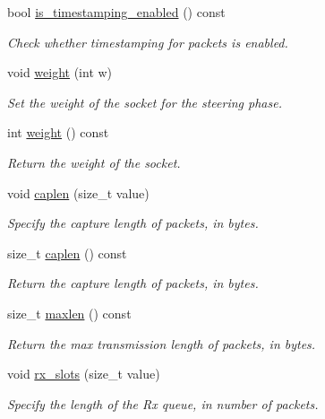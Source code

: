 \begin{DoxyCompactItemize}
bool \hyperlink{classpfq_1_1socket_a903d76a2685d7b64b9d0604686141fdc}{is\+\_\+timestamping\+\_\+enabled} () const 
\begin{DoxyCompactList}\small\item\em Check whether timestamping for packets is enabled. \end{DoxyCompactList}\item 
void \hyperlink{classpfq_1_1socket_ad843f3354b92083f01be9b5055f211b8}{weight} (int w)
\begin{DoxyCompactList}\small\item\em Set the weight of the socket for the steering phase. \end{DoxyCompactList}\item 
int \hyperlink{classpfq_1_1socket_a424e7a361a31569a8c6796d2c61b238d}{weight} () const 
\begin{DoxyCompactList}\small\item\em Return the weight of the socket. \end{DoxyCompactList}\item 
void \hyperlink{classpfq_1_1socket_ab68dbba5ef01041b9c96758c4a9f0a6c}{caplen} (size\+\_\+t value)
\begin{DoxyCompactList}\small\item\em Specify the capture length of packets, in bytes. \end{DoxyCompactList}\item 
size\+\_\+t \hyperlink{classpfq_1_1socket_a768bee4d974acdc5ee9ee879b0903c54}{caplen} () const 
\begin{DoxyCompactList}\small\item\em Return the capture length of packets, in bytes. \end{DoxyCompactList}\item 
size\+\_\+t \hyperlink{classpfq_1_1socket_a45bd7aa973fe4eccce899c552adfedb5}{maxlen} () const 
\begin{DoxyCompactList}\small\item\em Return the max transmission length of packets, in bytes. \end{DoxyCompactList}\item 
void \hyperlink{classpfq_1_1socket_a5cf700fc12d67b91df3d669ac4aa737a}{rx\+\_\+slots} (size\+\_\+t value)
\begin{DoxyCompactList}\small\item\em Specify the length of the Rx queue, in number of packets. \end{DoxyCompactList}\item 

\end{DoxyCompactItemize}
